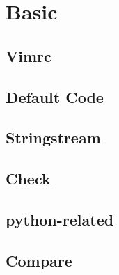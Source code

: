 \documentclass[a4paper,10pt,twocolumn,oneside]{article}
\begin{document}
\pagestyle{fancy}
\fancyfoot{}
\fancyhead[R]{\thepage}
\renewcommand{\headrulewidth}{0.4pt}
\renewcommand{\contentsname}{Contents} 

\scriptsize
\tableofcontents

\section{Basic}

\subsection{Vimrc}


\subsection{Default Code}


\subsection{Stringstream}


% 


\subsection{Check}


\subsection{python-related}


\subsection{Compare}


% 
\end{document}
